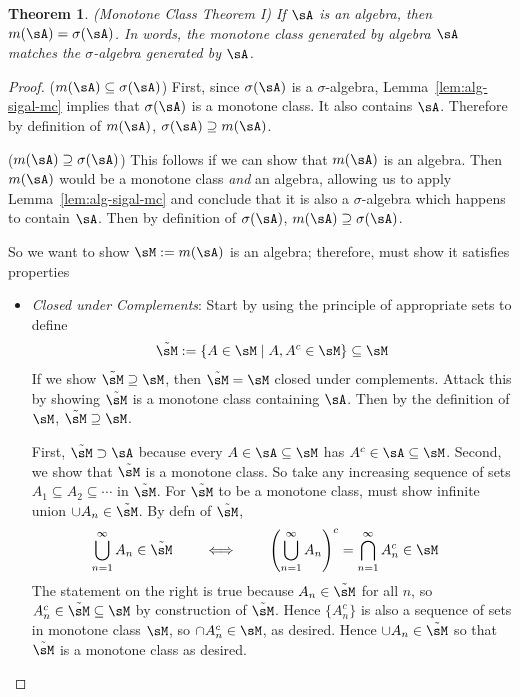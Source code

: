 \documentclass[12pt]{article}
\theoremstyle{plain}
\newtheorem{thm}{Theorem}[section]
\theoremstyle{definition}
\theoremstyle{remark}
\newcommand{\ninf}{_{n=1}^\infty}
\begin{document}
\begin{thm}\emph{(Monotone Class Theorem I)}
\label{thm:mct-1}
If $\sA$ is an algebra, then
$m(\sA) = \sigma(\sA)$.
In words, the monotone class generated by algebra $\sA$ matches the
$\sigma$-algebra generated by $\sA$.
\end{thm}
\begin{proof}
($m(\sA) \subseteq \sigma(\sA)$)
First, since $\sigma(\sA)$ is a $\sigma$-algebra,
Lemma~\ref{lem:alg-sigal-mc} implies that $\sigma(\sA)$ is a monotone
class. It also contains $\sA$. Therefore by definition of
$m(\sA)$, $\sigma(\sA)\supseteq m(\sA)$.

($m(\sA) \supseteq \sigma(\sA)$)
This follows if we can show that $m(\sA)$ is an algebra. Then $m(\sA)$
would be a monotone class \emph{and} an algebra, allowing us
to apply Lemma~\ref{lem:alg-sigal-mc} and conclude that it is
also a $\sigma$-algebra which happens to contain $\sA$.
Then by definition of $\sigma(\sA)$,
$m(\sA) \supseteq \sigma(\sA)$.

So we want to show $\sM:=m(\sA)$ is an algebra; therefore, must show it
satisfies properties
\begin{itemize}
  \item \emph{Closed under Complements}:
    Start by using the principle of appropriate sets to define
    \begin{align*}
      \tilde{\sM} := \{A\in\sM\;|\; A,A^c\in\sM\}
      \subseteq\sM
    \end{align*}
    If we show $\tilde{\sM}\supseteq \sM$, then $\tilde{\sM}=\sM$
    closed under complements.
    Attack this by showing $\tilde{\sM}$ is a monotone class
    containing $\sA$. Then by the definition of $\sM$,
    $\tilde{\sM}\supseteq \sM$.

    First, $\tilde{\sM}\supset \sA$ because every
    $A\in\sA\subseteq \sM$ has
    $A^c\in\sA\subseteq \sM$. Second, we show that
    $\tilde{\sM}$ is a monotone class.
    So take any increasing sequence
    of sets  $A_1\subseteq A_2\subseteq \cdots$ in $\tilde{\sM}$.
    For $\tilde{\sM}$ to be a monotone class, must show
    infinite union $\cup A_n\in\tilde{\sM}$.
    By defn of $\tilde{\sM}$,
    \begin{align*}
      \bigcup\ninf A_n &\in \tilde{\sM}
      \qquad\iff\qquad
      \left(\bigcup\ninf A_n\right)^c
      =
      \bigcap\ninf A_n^c
      \in \sM
    \end{align*}
    The statement on the right is true because
    $A_n\in\tilde{\sM}$ for all $n$, so
    $A_n^c\in\tilde{\sM}\subseteq\sM$ by construction of $\tilde{\sM}$.
    Hence $\{A_n^c\}$ is also a sequence of sets in monotone class
    $\sM$, so $\cap A_n^c\in\sM$, as desired.
    Hence $\cup A_n\in \tilde{\sM}$ so that $\tilde{\sM}$ is a monotone
    class as desired.


\end{itemize}
\end{proof}
\end{document}
